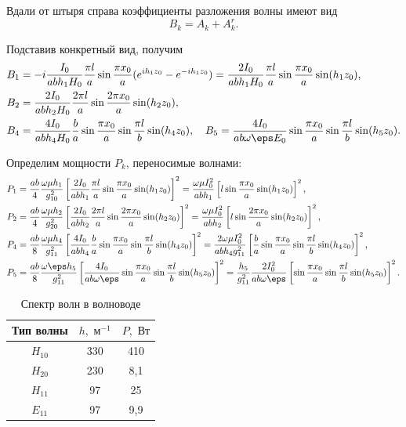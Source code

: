 \documentclass[a4paper,12pt]{extarticle}
\begin{document}
	Вдали от штыря справа коэффициенты разложения волны имеют вид
	\[
		B_k = A_k + A_k^r.
	\]

	Подставив конкретный вид, получим
	\begin{align*}
		& B_1 = -i\frac{I_0}{ab h_1 H_0} \frac{\pi l}{a}\sin\frac{\pi x_0}{a}(e^{ih_1z_0}  - e^{-ih_1z_0}) = \frac{2I_0}{ab h_1 H_0} \frac{\pi l}{a}\sin\frac{\pi x_0}{a}\sin(h_1z_0),\\
		& B_2 = \frac{2I_0}{ab h_2 H_0} \frac{2\pi l}{a}\sin\frac{2\pi x_0}{a}\sin(h_2z_0),\\
		& B_4 = \frac{4I_0}{ab h_4 H_0} \frac{b}{a}\sin\frac{\pi x_0}{a}\sin\frac{\pi l}{b}\sin(h_4z_0),\quad
		B_5 = \frac{4I_0}{ab\omega\eps E_0} \sin\frac{\pi x_0}{a}\sin\frac{\pi l}{b}\sin(h_5z_0).
	\end{align*}

	Определим мощности \( P_k \), переносимые волнами:
	\begin{align*}
		P_1 &= \frac{ab}{4}\frac{\omega\mu h_1}{g_{10}^2}\left[\frac{2I_0}{ab h_1} \frac{\pi l}{a}\sin\frac{\pi x_0}{a}\sin(h_1z_0)\right]^2= 
		\frac{\omega\mu I_0^2}{ab h_1}\left[l\sin\frac{\pi x_0}{a}\sin(h_1z_0)\right]^2,\\
		P_2 &= \frac{ab}{4}\frac{\omega\mu h_2}{g_{20}^2}\left[\frac{2I_0}{ab h_2} \frac{2\pi l}{a}\sin\frac{2\pi x_0}{a}\sin(h_2z_0)\right]^2= 
		\frac{\omega\mu I_0^2}{ab h_2}\left[l\sin\frac{2\pi x_0}{a}\sin(h_2z_0)\right]^2,\\
		P_4 &= \frac{ab}{8}\frac{\omega\mu h_4}{g_{11}^2}\left[\frac{4I_0}{ab h_4} \frac{b}{a}\sin\frac{\pi x_0}{a}\sin\frac{\pi l}{b}\sin(h_4z_0)\right]^2 = \frac{2\omega\mu I_0^2}{abh_4g_{11}^2}\left[\frac{b}{a}\sin\frac{\pi x_0}{a}\sin\frac{\pi l}{b}\sin(h_4z_0)\right]^2,\\
		P_5 &= \frac{ab}{8}\frac{\omega\eps h_5}{g_{11}^2} \left[\frac{4I_0}{ab\omega\eps} \sin\frac{\pi x_0}{a}\sin\frac{\pi l}{b}\sin(h_5z_0)\right]^2 =
		\frac{h_5}{g_{11}^2} \frac{2I_0^2}{ab\omega\eps} \left[\sin\frac{\pi x_0}{a}\sin\frac{\pi l}{b}\sin(h_5z_0)\right]^2.
	\end{align*}

	\begin{table}[h]
		\center
		\caption{Спектр волн в волноводе}
		\begin{tabular}{|c|c|c|}\hline
		Тип волны & $h,\text{ м}^{-1}$ & $P,\text{ Вт}$ \\ \hline
		$H_{10}$ & 330 & 410 \\
		$H_{20}$ & 230 & 8,1 \\
		$H_{11}$ & 97 & 25 \\
		$E_{11}$ & 97 & 9,9 \\ \hline
		\end{tabular}
	\end{table}
\end{document}
